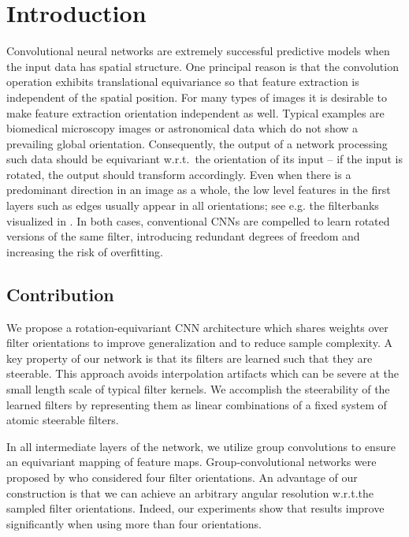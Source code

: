 \documentclass[10pt,twocolumn,letterpaper]{article}
\begin{document}
\section{Introduction}
\vspace*{-.75ex}
Convolutional neural networks are extremely successful predictive models when the input data has spatial structure.
One principal reason is that the convolution operation exhibits translational equivariance so that feature extraction is independent of the spatial position.
For many types of images it is desirable to make feature extraction orientation independent as well.
Typical examples are biomedical microscopy images or astronomical data which do not show a prevailing global orientation.
Consequently, the output of a network processing such data should be equivariant w.r.t.~the orientation of its input
-- if the input is rotated, the output should transform accordingly.
Even when there is a predominant direction in an image as a whole, the low level features in the first layers such as edges usually appear in all orientations; see e.g. the filterbanks visualized in \cite{DBLP:journals/corr/ZeilerF13}.
In both cases, conventional CNNs are compelled to learn rotated versions of the same filter, introducing redundant degrees of freedom and increasing the risk of overfitting.

\vspace{-.5ex}
\subsection{Contribution}
\vspace{-.75ex}
We propose a rotation-equivariant CNN architecture which shares weights over filter orientations to improve generalization and to reduce sample complexity.
A key property of our network is that its filters are learned such that they are steerable.
This approach avoids interpolation artifacts which can be severe at the small length scale of typical filter kernels.
We accomplish the steerability of the learned filters by representing them as linear combinations of a fixed system of atomic steerable filters.

In all intermediate layers of the network, we utilize group convolutions to ensure an equivariant mapping of feature maps.
Group-convolutional networks were proposed by \citet{cohen2016group} who considered four filter orientations.
An advantage of our construction is that we can achieve an arbitrary angular resolution w.r.t.\@ the sampled filter orientations.
Indeed, our experiments show that results improve significantly when using more than four orientations.
\end{document}
